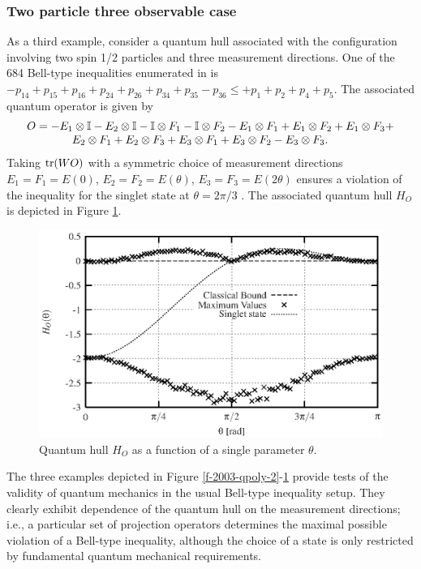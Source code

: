 \documentclass[pra,showpacs,showkeys,amsfonts]{revtex4}
\begin{document}
\subsubsection{Two particle three observable case}
As a third example, consider a quantum hull associated with the
configuration involving two spin 1/2 particles and
three measurement directions. One of the 684 Bell-type inequalities enumerated in
\cite{2000-poly} is
$  - p_{14} + p_{15} + p_{16} +
  p_{24} + p_{26} + p_{34} + p_{35} - p_{36} \leq +p_{1}+ p_{2} + p_{4} + p_{5}$.
The associated quantum operator is given by
\begin{equation}
\begin{array}{l}
  O=- {E}_1 \otimes {\Bbb I} - {E}_2 \otimes {\Bbb I} - {\Bbb I} \otimes {F}_1 - {\Bbb I} \otimes
  {F}_2 -
  {E}_1 \otimes {F}_1 + {E}_1 \otimes {F}_2 + {E}_1 \otimes {F}_3 +\\
\qquad \qquad {E}_2
  \otimes {F}_1 + {E}_2 \otimes {F}_3 +
  {E}_3 \otimes {F}_1 + {E}_3 \otimes {F}_2 - {E}_3 \otimes {F}_3.
\end{array}
  \label{e-2003-poly-xyz}
\end{equation}
Taking ${\rm tr}(WO)$ with a symmetric choice of measurement
directions
${E}_1={F}_1=E(0)$,
${E}_2={F}_2=E(\theta)$,
${E}_3={F}_3=E(2\theta)$ ensures a violation of the inequality for the
singlet state at $\theta=2\pi/3$ \cite{2000-poly}.
The associated
quantum hull  $H_{O}$ is depicted in Figure  \ref{f-2003-plotpit}.
\begin{figure}
  \centering
  \includegraphics{2003-qpoly-plotpit}
  \caption{Quantum hull $H_{O}$  as a function of a single parameter $\theta$.}
  \label{f-2003-plotpit}
\end{figure}

The three examples depicted in Figure
\ref{f-2003-qpoly-2}-\ref{f-2003-plotpit} provide tests of the
validity of quantum mechanics in the usual Bell-type inequality setup.
They clearly exhibit dependence of
the quantum hull on
the measurement directions; i.e.,
 a particular set of
projection operators determines the maximal possible violation of a
Bell-type inequality, although the choice of a state is only
restricted by fundamental quantum mechanical requirements.
\end{document}
